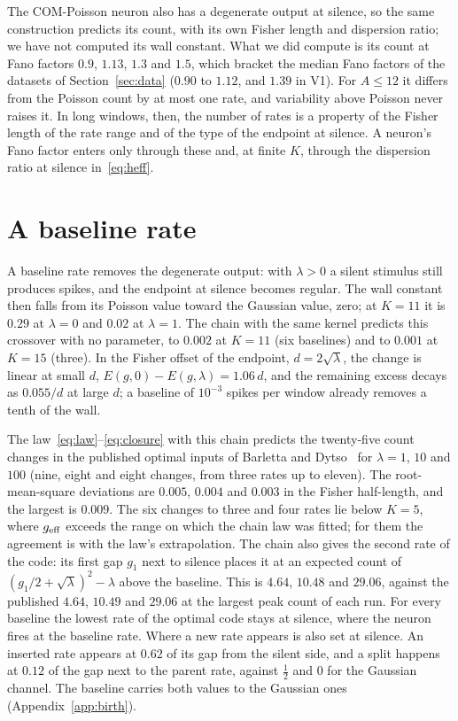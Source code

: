 \documentclass[journal]{IEEEtran}
\begin{document}
The COM-Poisson neuron also has a degenerate output at silence, so the same construction predicts its count, with its own Fisher length
and dispersion ratio; we have not computed its wall constant. What we did compute is its count at Fano factors $0.9$, $1.13$, $1.3$
and $1.5$, which bracket the median Fano factors of the datasets of Section~\ref{sec:data} ($0.90$ to $1.12$, and $1.39$ in V1). For
$A \le 12$ it differs from the Poisson count by at most one rate, and variability above Poisson never raises it. In long windows, then, the number of rates is a property of the Fisher length of the rate range
and of the type of the endpoint at silence. A neuron's Fano factor enters only through these and, at finite $K$, through the
dispersion ratio at silence in~\eqref{eq:heff}.

\section{A baseline rate}\label{sec:baseline}
A baseline rate removes the degenerate output: with $\lambda > 0$ a silent stimulus still produces spikes, and the endpoint at silence
becomes regular. The wall constant then falls from its Poisson value toward the Gaussian value, zero; at $K = 11$ it is $0.29$ at
$\lambda = 0$ and $0.02$ at $\lambda = 1$. The chain with the same kernel predicts this crossover with no parameter, to $0.002$ at
$K = 11$ (six baselines) and to $0.001$ at $K = 15$ (three). In the Fisher offset of the endpoint, $d = 2\sqrt\lambda$, the change is
linear at small $d$, $E(g, 0) - E(g, \lambda) = 1.06\,d$, and the remaining excess decays as $0.055/d$ at large $d$; a baseline of
$10^{-3}$ spikes per window already removes a tenth of the wall.

The law~\eqref{eq:law}--\eqref{eq:closure} with this chain predicts the twenty-five count changes in the published optimal inputs of
Barletta and Dytso~\cite{BarlettaDytso2022} for $\lambda = 1$, $10$ and $100$ (nine, eight and eight changes, from three rates up to
eleven). The root-mean-square deviations are $0.005$, $0.004$ and $0.003$ in the Fisher half-length, and the largest is $0.009$. The six
changes to three and four rates lie below $K = 5$, where $g_{\rm eff}$ exceeds the range on which the chain law was fitted; for them the
agreement is with the law's extrapolation. The chain also gives the second rate
of the code: its first gap $g_1$ next to silence places it at an expected count of $(g_1/2 + \sqrt\lambda)^2 - \lambda$ above the
baseline. This is $4.64$, $10.48$ and $29.06$, against the published $4.64$, $10.49$ and $29.06$ at the largest peak count of each run. For every baseline the
lowest rate of the optimal code stays at silence, where the neuron fires at the baseline rate. Where a new rate appears is also set
at silence. An inserted rate appears at $0.62$ of its gap from the silent side, and a split happens at $0.12$ of the gap next to the
parent rate, against $\frac12$ and $0$ for the Gaussian channel. The baseline carries both values to the Gaussian ones
(Appendix~\ref{app:birth}).
\end{document}
